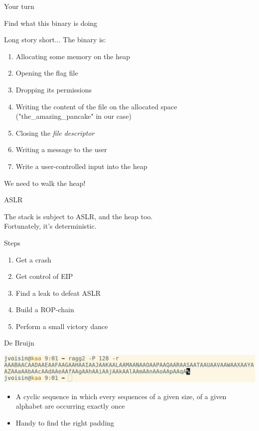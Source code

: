 \documentclass{beamer}
\begin{document}
\begin{frame}{Your turn}
    \begin{center}
        \Large Find what this binary is doing
    \end{center}
\end{frame}

\begin{frame}{Long story short...}
    The binary is:
    \begin{enumerate}
        \item Allocating some memory on the heap
        \item Opening the \alert{flag} file
        \item Dropping its permissions
        \item Writing the content of the file on the allocated space ("the\_amazing\_pancake" in our case)
        \item Closing the \emph{file descriptor}
        \item Writing a message to the user
        \item Write a user-controlled input into the heap
    \end{enumerate}
    We need to walk the heap!
\end{frame}

\begin{frame}{ASLR}
    \begin{center}
    The stack is subject to ASLR, and the heap too.\\

    Fortunately, it's \alert{deterministic}.
    \end{center}
\end{frame}

\begin{frame}{Steps}
    \begin{enumerate}
        \item Get a crash
        \item Get control of EIP
        \item Find a leak to defeat ASLR
        \item Build a ROP-chain
        \item Perform a small victory dance
    \end{enumerate}
\end{frame}

\begin{frame}{De Bruijn}
    \begin{center}
        \includegraphics[width=\textwidth]{debruijn.png}
        \begin{itemize}
            \item A cyclic sequence in which every sequences of a given size,
                of a given alphabet are occurring exactly once
            \item Handy to find the right padding
        \end{itemize}
    \end{center}
\end{frame}
\end{document}
